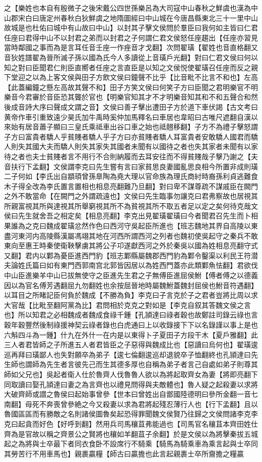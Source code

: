 之【樂姓也本自有殷微子之後宋戴公四世孫樂呂為大司寇中山春秋之鮮虞也漢為中山郡宋白曰唐定州春秋白狄鮮虞之地隋圖經曰中山城在今唐昌縣東北三十一里中山故城是也杜佑曰城中有山故曰中山】以封其子擊文侯問於羣臣曰我何如主皆曰仁君任座曰君得中山不以封君之弟而以封君之子何謂仁君文侯怒任座趨出【任座亦習見當時鄰國之事而為是言耳任音壬座一作痤音才戈翻】次問翟璜【翟姓也音直格翻又音狄姓譜翟為晉所滅子孫以國為氏今人多讀從上音璜戶光翻】對曰仁君文侯曰何以知之對曰臣聞君仁則臣直嚮者任座之言直臣是以知之文侯悦使翟璜召任座而反之親下堂迎之以為上客文侯與田子方飲文侯曰鐘聲不比乎【比音毗不比言不和也】左高【此蓋編鐘之懸左高故其聲不和】田子方笑文侯曰何笑子方曰臣聞之君明樂官不明樂音今君審於音臣恐其聾於官也【明樂官知其才不才明樂音知其和不和五聲合和然後成音詩大序曰聲成文謂之音】文侯曰善子擊出遭田子方於道下車伏謁【古文考曰黄帝作車引重致遠少昊氏加牛禹時奚仲加馬釋名曰車居也韋昭曰古唯尺遮翻自漢以來始有居音蕭子顯曰三皇氏乘祗車出谷口車之始也祗翹移翻】子方不為禮子擊怒謂子方曰富貴者驕人乎貧賤者驕人乎子方曰亦貧賤者驕人耳富貴者安敢驕人國君而驕人則失其國大夫而驕人則失其家失其國者未聞有以國待之者也失其家者未聞有以家待之者也夫士貧賤者言不用行不合則納履而去耳安往而不得貧賤哉子擊乃謝之【夫音扶行下孟翻】文侯謂李克曰先生嘗有言曰家貧思良妻國亂思良相今所置非成則璜二子何如【李氏出自顓頊曾孫臯陶為堯大理以官命族為理氏商紂時裔孫利貞逃難食木子得全改為李氏置言置相也相息亮翻難乃旦翻】對曰卑不謀尊疏不謀戚臣在闕門之外不敢當命【在闕門之外謂疏遠也】文侯曰先生臨事勿讓克曰君弗察故也居視其所親富視其所與達視其所舉窮視其所不為貧視其所不取五者足以定之矣何待克哉文侯曰先生就舍吾之相定矣【相息亮翻】李克出見翟璜翟璜曰今者聞君召先生而卜相果誰為之克曰魏成翟璜忿然作色曰西河守吳起臣所進也【班志魏地其界自高陵以東盡河東河内高陵縣漢屬馮翊其地在河西所謂西河之列者也魏初使吳起守之秦兵不敢東向至惠王時秦使衛鞅擊虜其將公子卭遂獻西河之外於秦吳以國為姓相息亮翻守式又翻】君内以鄴為憂臣進西門豹【班志鄴縣屬魏郡西門豹為鄴令鑿渠以利民王符潜夫論姓氏篇曰如有東門西郭南宫北郭皆因居以為姓西門蓋亦此類鄴魚怯翻】君欲伐中山臣進樂羊中山已拔無使守之臣進先生君之子無傅臣進屈侯鮒【傅者傅之以德義因以為官名傅芳遇翻屈九勿翻姓也余按屈晉地時屬魏鮒蓋魏封屈侯也鮒音符遇翻】以耳目之所睹記臣何負於魏成【不勝為負】李克曰子言克於子之君者豈將比周以求大官哉【比毗至翻阿黨為比】君問相於克克之對如是【李克自叙其答魏文侯之言也】所以知君之必相魏成者魏成食祿千鍾【孔頴達曰祿者穀也故鄭註司錄云祿也言穀年穀豐然後制祿援神契云祿者錄也白虎通曰上以收錄接下下以名錄謹以事上是也六斛四斗為一鍾】什九在外什一在内是以東得卜子夏田子方段干木【夏戶雅翻】此三人者君皆師之子所進五人者君皆臣之子惡得與魏成比也【惡讀曰烏何也】翟璜逡巡再拜曰璜鄙人也失對願卒為弟子【逡七倫翻逡巡却退貌卒子恤翻終也孔頴達曰先生師也謂師為先生者言彼先己而生其德多厚也自稱為弟子者言己自處如弟子則尊其師如父兄也】吳起者衛人仕於魯齊人伐魯魯人欲以為將起取齊女為妻【將即亮翻下同取讀曰娶孔頴達曰妻之為言齊也以禮見問得與夫敵體也】魯人疑之起殺妻以求將大破齊師或譛之魯侯曰起始事曾參【世本曰曾姓出自鄫國陸德明曰參所金翻一音七南翻】母死不奔喪曾參絶之今又殺妻以求為君將起殘忍薄行人也【行下孟翻】且以魯國區區而有勝敵之名則諸侯圖魯矣起恐得罪聞魏文侯賢乃往歸之文侯問諸李克李克曰起貪而好色【好呼到翻】然用兵司馬穰苴弗能過也【司馬官名穰苴本齊田姓仕齊為是官故以稱之齊景公之賢將也穰如羊翻苴子余翻】於是文侯以為將擊秦拔五城起之為將與士卒最下者同衣食卧不設席行不騎乘【騎馬為騎乘車為乘言起與士卒同其勞苦行不用車馬也】親裹贏糧【師古曰贏擔也此言起親裹士卒所齎擔之糧贏